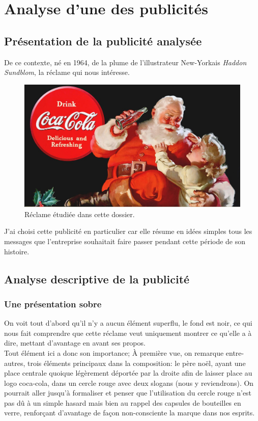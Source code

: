 \chapter{Analyse d'une des publicités}

\label{Analyse d'une des publicités}

\section{Présentation de la publicité analysée}

De ce contexte, né en 1964, de la plume de l'illustrateur New-Yorkais \textit{Haddon Sundblom}, la réclame qui nous intéresse.

\begin{figure}[th]
\centering
\includegraphics[width=130mm]{medias/affiche_coca}
\decoRule
\caption{Réclame étudiée dans cette dossier.}
\end{figure}

J'ai choisi cette publicité en particulier car elle résume en idées simples tous les messages que l'entreprise souhaitait faire passer pendant cette période de son histoire.


\section{Analyse descriptive de la publicité}

\subsection{Une présentation sobre}

On voit tout d'abord qu'il n'y a aucun élément superflu, le fond est noir, ce qui nous fait comprendre que cette réclame veut uniquement montrer ce qu'elle a à dire, mettant d'avantage en avant ses propos.\\
Tout élément ici a donc son importance; À première vue, on remarque entre-autres, trois éléments principaux dans la composition: le père noël, ayant une place centrale quoique légèrement déportée par la droite afin de laisser place au logo coca-cola, dans un cercle rouge avec deux slogans (nous y reviendrons). On pourrait aller jusqu'à formaliser et penser que l'utilisation du cercle rouge n'est pas dû à un simple hasard mais bien au rappel des capsules de bouteilles en verre, renforçant d'avantage de façon non-consciente la marque dans nos esprits.

